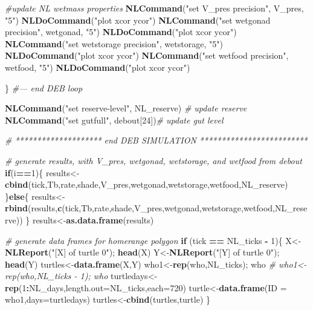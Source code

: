 \documentclass[]{article}
\newenvironment{Shaded}{\begin{snugshade}}{\end{snugshade}}
\newcommand{\KeywordTok}[1]{\textcolor[rgb]{0.13,0.29,0.53}{\textbf{#1}}}
\newcommand{\DataTypeTok}[1]{\textcolor[rgb]{0.13,0.29,0.53}{#1}}
\newcommand{\DecValTok}[1]{\textcolor[rgb]{0.00,0.00,0.81}{#1}}
\newcommand{\StringTok}[1]{\textcolor[rgb]{0.31,0.60,0.02}{#1}}
\newcommand{\CommentTok}[1]{\textcolor[rgb]{0.56,0.35,0.01}{\textit{#1}}}
\newcommand{\ControlFlowTok}[1]{\textcolor[rgb]{0.13,0.29,0.53}{\textbf{#1}}}
\newcommand{\OperatorTok}[1]{\textcolor[rgb]{0.81,0.36,0.00}{\textbf{#1}}}
\newcommand{\NormalTok}[1]{#1}
\begin{document}
\begin{Shaded}
\begin{Highlighting}[]
\CommentTok{#update NL wetmass properties }
\KeywordTok{NLCommand}\NormalTok{(}\StringTok{"set V_pres precision"}\NormalTok{, V_pres, }\StringTok{"5"}\NormalTok{)}
\KeywordTok{NLDoCommand}\NormalTok{(}\StringTok{"plot xcor ycor"}\NormalTok{)}
\KeywordTok{NLCommand}\NormalTok{(}\StringTok{"set wetgonad precision"}\NormalTok{, wetgonad, }\StringTok{"5"}\NormalTok{)}
\KeywordTok{NLDoCommand}\NormalTok{(}\StringTok{"plot xcor ycor"}\NormalTok{)}
\KeywordTok{NLCommand}\NormalTok{(}\StringTok{"set wetstorage precision"}\NormalTok{, wetstorage, }\StringTok{"5"}\NormalTok{)}
\KeywordTok{NLDoCommand}\NormalTok{(}\StringTok{"plot xcor ycor"}\NormalTok{)}
\KeywordTok{NLCommand}\NormalTok{(}\StringTok{"set wetfood precision"}\NormalTok{, wetfood, }\StringTok{"5"}\NormalTok{)}
\KeywordTok{NLDoCommand}\NormalTok{(}\StringTok{"plot xcor ycor"}\NormalTok{) }
 

\NormalTok{\} }\CommentTok{#--- end DEB loop}

\KeywordTok{NLCommand}\NormalTok{(}\StringTok{"set reserve-level"}\NormalTok{, NL_reserve) }\CommentTok{# update reserve}
\KeywordTok{NLCommand}\NormalTok{(}\StringTok{"set gutfull"}\NormalTok{, debout[}\DecValTok{24}\NormalTok{])}\CommentTok{# update gut level}

\CommentTok{# ******************** end DEB SIMULATION *************************}

\CommentTok{# generate results, with V_pres, wetgonad, wetstorage, and wetfood from debout}
\ControlFlowTok{if}\NormalTok{(i}\OperatorTok{==}\DecValTok{1}\NormalTok{)\{}
\NormalTok{    results<-}\KeywordTok{cbind}\NormalTok{(tick,Tb,rate,shade,V_pres,wetgonad,wetstorage,wetfood,NL_reserve) }
\NormalTok{    \}}\ControlFlowTok{else}\NormalTok{\{}
\NormalTok{        results<-}\KeywordTok{rbind}\NormalTok{(results,}\KeywordTok{c}\NormalTok{(tick,Tb,rate,shade,V_pres,wetgonad,wetstorage,wetfood,NL_reserve))}
\NormalTok{        \}}
\NormalTok{results<-}\KeywordTok{as.data.frame}\NormalTok{(results)}

\CommentTok{# generate data frames for homerange polygon}
\ControlFlowTok{if}\NormalTok{ (tick }\OperatorTok{==}\StringTok{ }\NormalTok{NL_ticks }\OperatorTok{-}\StringTok{ }\DecValTok{1}\NormalTok{)\{}
\NormalTok{    X<-}\KeywordTok{NLReport}\NormalTok{(}\StringTok{"[X] of turtle 0"}\NormalTok{); }\KeywordTok{head}\NormalTok{(X)}
\NormalTok{    Y<-}\KeywordTok{NLReport}\NormalTok{(}\StringTok{"[Y] of turtle 0"}\NormalTok{); }\KeywordTok{head}\NormalTok{(Y)}
\NormalTok{    turtles<-}\KeywordTok{data.frame}\NormalTok{(X,Y)}
\NormalTok{    who1<-}\KeywordTok{rep}\NormalTok{(who,NL_ticks); who }\CommentTok{# who1<-rep(who,NL_ticks - 1); who }
\NormalTok{    turtledays<-}\KeywordTok{rep}\NormalTok{(}\DecValTok{1}\OperatorTok{:}\NormalTok{NL_days,}\DataTypeTok{length.out=}\NormalTok{NL_ticks,}\DataTypeTok{each=}\DecValTok{720}\NormalTok{) }
\NormalTok{    turtle<-}\KeywordTok{data.frame}\NormalTok{(}\DataTypeTok{ID =}\NormalTok{ who1,}\DataTypeTok{days=}\NormalTok{turtledays)}
\NormalTok{    turtles<-}\KeywordTok{cbind}\NormalTok{(turtles,turtle)}
\NormalTok{    \}}


\end{Highlighting}
\end{Shaded}
\end{document}
